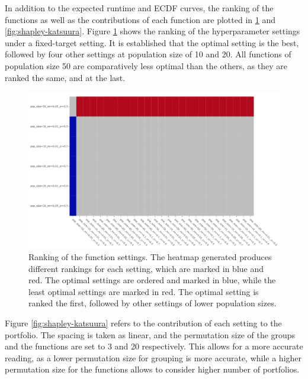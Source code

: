 \documentclass{article}
\begin{document}
In addition to the expected runtime and ECDF curves, the ranking of the functions as well as the contributions of each function are plotted in \ref{fig:ranking-Katsuura} and \ref{fig:shapley-katsuura}. Figure \ref{fig:ranking-Katsuura} shows the ranking of the hyperparameter settings under a fixed-target setting. It is established that the optimal setting is the best, followed by four other settings at population size of 10 and 20. All functions of population size 50 are comparatively less optimal than the others, as they are ranked the same, and at the last. \\
\begin{figure}[h!]
    \centering
    \includegraphics[width=0.9\linewidth]{Graphs/Katsuura/Ranking.png}
    \caption{Ranking of the function settings. The heatmap generated produces different rankings for each setting, which are marked in blue and red. The optimal settings are ordered and marked in blue, while the least optimal settings are marked in red. The optimal setting is ranked the first, followed by other settings of lower population sizes.}
    \label{fig:ranking-Katsuura}
\end{figure}
Figure \ref{fig:shapley-katsuura} refers to the contribution of each setting to the portfolio. The spacing is taken as linear, and the permutation size of the groups and the functions are set to 3 and 20 respectively. This allows for a more accurate reading, as a lower permutation size for grouping is more accurate, while a higher permutation size for the functions allows to consider higher number of portfolios. 
\end{document}
